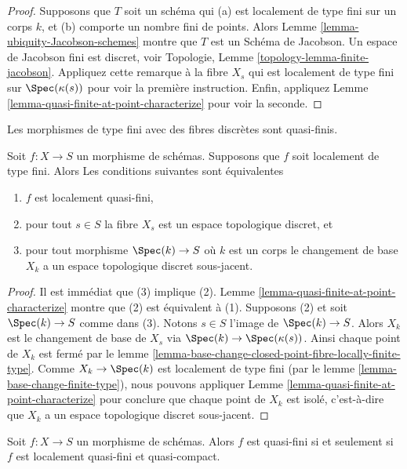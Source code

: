 \begin{proof}
Supposons que $T$ soit un schéma qui (a) est localement
de type fini sur un corps $k$, et (b) comporte
un nombre fini de points. Alors Lemme \ref{lemma-ubiquity-Jacobson-schemes} montre
que $T$ est un Schéma de Jacobson. Un espace
de Jacobson fini est discret, voir Topologie, Lemme
\ref{topology-lemma-finite-jacobson}. Appliquez cette remarque à la fibre $X_s$ qui est localement
de type fini sur $\Spec(\kappa(s))$ pour voir la première instruction.
Enfin, appliquez Lemme \ref{lemma-quasi-finite-at-point-characterize} pour voir la seconde.
\end{proof}

\begin{lemma}
\label{lemma-locally-quasi-finite-fibres}
\begin{slogan}
Les morphismes de type fini avec des fibres discrètes sont quasi-finis.
\end{slogan}
Soit $f : X \to S$ un morphisme de schémas. Supposons que $f$
soit localement de type fini. Alors Les
conditions suivantes sont équivalentes
\begin{enumerate}
\item $f$ est localement quasi-fini,
\item pour tout $s \in S$ la fibre $X_s$ est un espace topologique discret, et
\item pour tout morphisme $\Spec(k) \to S$ où $k$ est un corps le changement
de base $X_k$ a un espace topologique discret sous-jacent.
\end{enumerate}
\end{lemma}

\begin{proof}
Il est immédiat que (3) implique
(2). Lemme \ref{lemma-quasi-finite-at-point-characterize} montre que (2) est équivalent
à (1). Supposons (2)
et soit $\Spec(k) \to S$ comme dans (3).
Notons $s \in S$ l'image de $\Spec(k) \to S$.
Alors $X_k$ est le changement
de base de $X_s$ via $\Spec(k) \to \Spec(\kappa(s))$.
Ainsi chaque point
de $X_k$ est fermé par le lemme \ref{lemma-base-change-closed-point-fibre-locally-finite-type}. Comme $X_k \to \Spec(k)$
est localement de type fini (par
le lemme \ref{lemma-base-change-finite-type}), nous pouvons
appliquer
Lemme \ref{lemma-quasi-finite-at-point-characterize} pour conclure que chaque point de
$X_k$ est isolé, c'est-à-dire que $X_k$ a un espace
topologique discret sous-jacent.
\end{proof}

\begin{lemma}
\label{lemma-quasi-finite-locally-quasi-compact}
Soit $f : X \to S$ un morphisme de schémas. Alors $f$
est quasi-fini si et seulement si $f$
est localement quasi-fini et quasi-compact.
\end{lemma}

